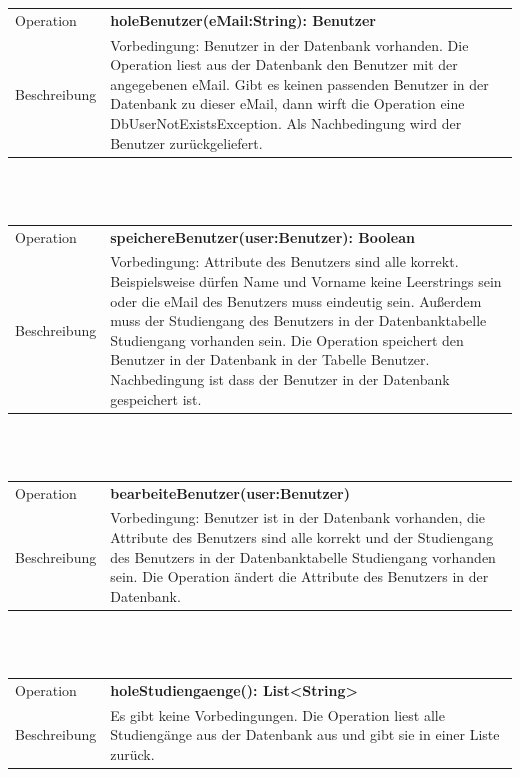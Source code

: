 \documentclass[12pt]{scrreprt}
\begin{document}
\begin{tabular}{|lp{12cm}|}
	\hline
	Operation &  \textbf{holeBenutzer(eMail:String): Benutzer}\\ 
	Beschreibung & Vorbedingung: Benutzer in der Datenbank vorhanden. Die Operation liest aus der Datenbank den Benutzer mit der angegebenen eMail. Gibt es keinen passenden Benutzer in der Datenbank zu dieser eMail, dann wirft die Operation eine DbUserNotExistsException. Als Nachbedingung wird der Benutzer zurückgeliefert.\\
	\hline 
\end{tabular} \\\\

\begin{tabular}{|lp{12cm}|}
	\hline
	Operation &  \textbf{speichereBenutzer(user:Benutzer): Boolean}\\ 
	Beschreibung & Vorbedingung: Attribute des Benutzers sind alle korrekt. Beispielsweise dürfen Name und Vorname keine Leerstrings sein oder die eMail des Benutzers muss eindeutig sein. Außerdem muss der Studiengang des Benutzers in der Datenbanktabelle Studiengang vorhanden sein. Die Operation speichert den Benutzer in der Datenbank in der Tabelle Benutzer. Nachbedingung ist dass der Benutzer in der Datenbank gespeichert ist.\\
	\hline 
\end{tabular} \\\\

\begin{tabular}{|lp{12cm}|}
	\hline
	Operation &  \textbf{bearbeiteBenutzer(user:Benutzer)}\\ 
	Beschreibung & Vorbedingung: Benutzer ist in der Datenbank vorhanden, die Attribute des Benutzers sind alle korrekt und der Studiengang des Benutzers in der Datenbanktabelle Studiengang vorhanden sein. Die Operation ändert die Attribute des Benutzers in der Datenbank.\\
	\hline 
	
\end{tabular} \\\\

\begin{tabular}{|lp{12cm}|}
	\hline
	Operation &  \textbf{holeStudiengaenge(): List<String>}\\ 
	Beschreibung & Es gibt keine Vorbedingungen. Die Operation liest alle Studiengänge aus der Datenbank aus und gibt sie in einer Liste zurück.\\
		\hline 
\end{tabular} \\\\
\end{document}
